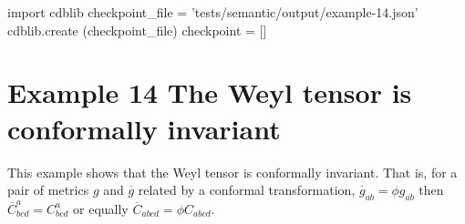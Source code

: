 \documentclass[12pt]{cdblatex}
\begin{document}
\bgroup
{}
\begin{cadabra}
   import cdblib
   checkpoint_file = 'tests/semantic/output/example-14.json'
   cdblib.create (checkpoint_file)
   checkpoint = []
\end{cadabra}
\egroup

\clearpage

\section*{Example 14 The Weyl tensor is conformally invariant}

This example shows that the Weyl tensor is conformally invariant. That is, for a pair of
metrics $g$ and $\overline{g}$ related by a conformal transformation,
$\overline{g}_{a b} = \phi g_{a b}$ then $\overline{C}^{a}_{b c d} = C^{a}_{b c d}$
or equally $\overline{C}_{a b c d} = \phi C_{a b c d}$.
\end{document}
